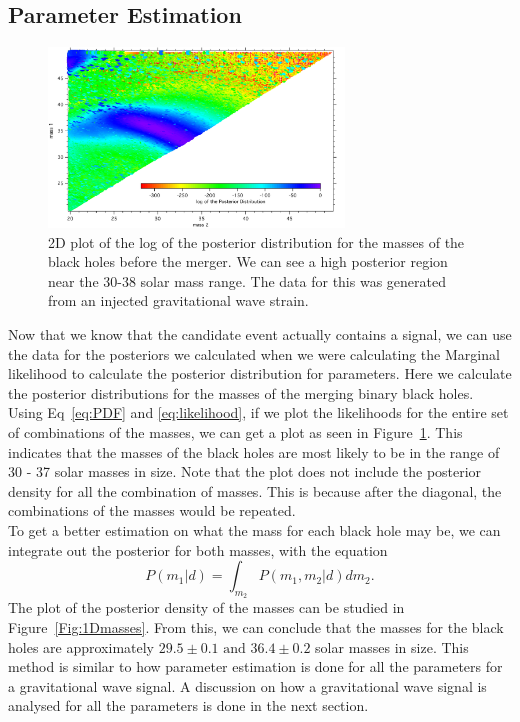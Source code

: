 \documentclass{article}
\begin{document}
 
 
 \subsection{Parameter Estimation}
 
     \begin{figure}[h]
     	\centering
     	\includegraphics[width=0.7\textwidth]{Figures/m1m2.pdf} 
     	\caption{2D plot of the log of the posterior distribution for the masses of the black holes before the merger. We can see a high posterior region near the 30-38 solar mass range. The data for this was generated from an injected gravitational wave strain.}
     	\label{Fig:2Dmasses}
     \end{figure}
 
 Now that we know that the candidate event actually contains a signal, we can use the data for the posteriors we calculated when we were calculating the Marginal likelihood to calculate the posterior distribution for parameters. Here we calculate the posterior distributions for the masses of the merging binary black holes. Using Eq~\ref{eq:PDF} and \ref{eq:likelihood}, if we plot the likelihoods for the entire set of combinations of the masses, we can get a plot as seen in Figure~\ref{Fig:2Dmasses}. This indicates that the masses of the black holes are most likely to be in the range of 30 - 37 solar masses in size. Note that the plot does not include the posterior density for all the combination of masses. This is because after the diagonal, the combinations of the masses would be repeated. \\
 

   
 
 
 To get a better estimation on what the mass for each black hole may be, we can integrate out the posterior for both masses, with the equation $$P(m_1|d)= \int_{m_2} {P(m_1, m_2 | d) dm_2}.$$ The plot of the posterior density of the masses can be studied in Figure~\ref{Fig:1Dmasses}. From this, we can conclude that the masses for the black holes are approximately $29.5\pm0.1 \text{ and } 36.4\pm0.2$ solar masses in size. This method is similar to how parameter estimation is done for all the parameters for a gravitational wave signal. A discussion on how a gravitational wave signal is analysed for all the parameters is done in the next section.\\
 
\end{document}
